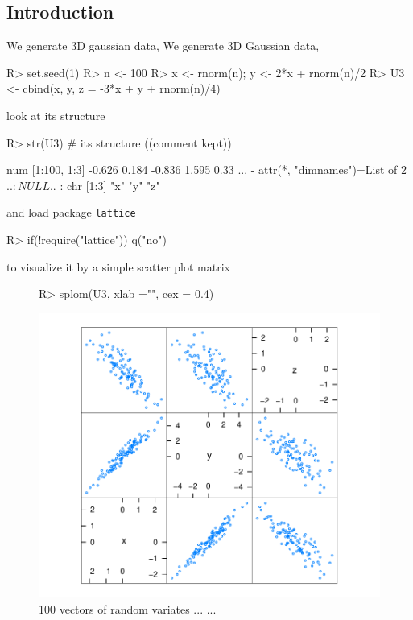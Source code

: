 \documentclass{article}
\begin{document}
\subsection*{Introduction}

We generate 3D gaussian data,
We generate 3D Gaussian data,
\begin{Schunk}
\begin{Sinput}
R> set.seed(1)
R> n <- 100
R> x <- rnorm(n); y <- 2*x + rnorm(n)/2
R> U3 <- cbind(x, y, z = -3*x + y + rnorm(n)/4)
\end{Sinput}
\end{Schunk}
look at its structure
\begin{Schunk}
\begin{Sinput}
R> str(U3) # its structure ((comment kept))
\end{Sinput}
\begin{Soutput}
 num [1:100, 1:3] -0.626 0.184 -0.836 1.595 0.33 ...
 - attr(*, "dimnames")=List of 2
  ..$ : NULL
  ..$ : chr [1:3] "x" "y" "z"
\end{Soutput}
\end{Schunk}
and load package \texttt{lattice}
\begin{Schunk}
\begin{Sinput}
R> if(!require("lattice")) q("no")
\end{Sinput}
\end{Schunk}
to visualize it by a simple scatter plot matrix
\begin{figure}[h!]
\centering
\begin{Schunk}
\begin{Sinput}
R> splom(U3, xlab ="", cex = 0.4)
\end{Sinput}
\end{Schunk}
\includegraphics{swv-keepSrc-1-splom}
\caption{100 vectors of random variates ... ...}
\label{fig:AC_Joe}
\end{figure}
\end{document}
